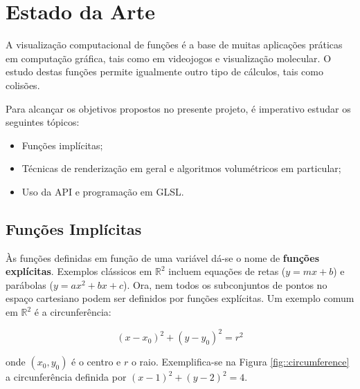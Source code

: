 \chapter{Estado da Arte}
\label{ch::arte}


A visualização computacional de funções é a base de muitas aplicações práticas em computação gráfica, tais como em videojogos e visualização molecular. O estudo destas funções permite igualmente outro tipo de cálculos, tais como colisões.

Para alcançar os objetivos propostos no presente projeto, é imperativo estudar os seguintes tópicos:

\begin{itemize}[nosep]
	\item Funções implícitas;
	\item Técnicas de renderização em geral e algoritmos volumétricos em particular;
	\item Uso da \ac{API} \opengl e programação em \ac{GLSL}.
\end{itemize}


\section{Funções Implícitas}
\label{sec::arte:implicitas}



Às funções definidas em função de uma variável dá-se o nome de \textbf{funções explícitas}. Exemplos clássicos em $\mathbb{R}^2$ incluem equações de retas ($y = mx + b$) e parábolas ($y = ax^2 + bx + c$). Ora, nem todos os subconjuntos de pontos no espaço cartesiano podem ser definidos por funções explícitas. Um exemplo comum em $\mathbb{R}^2$ é a circunferência:

\begin{equation}
	(x - x_0)^2 + (y - y_0)^2 = r^2
	\label{eq::circ_implicita}
\end{equation}

onde $(x_0, y_0)$ é o centro e $r$ o raio. Exemplifica-se na Figura \ref{fig::circumference} a circunferência definida por $(x - 1)^2 + (y - 2)^2 = 4$.

